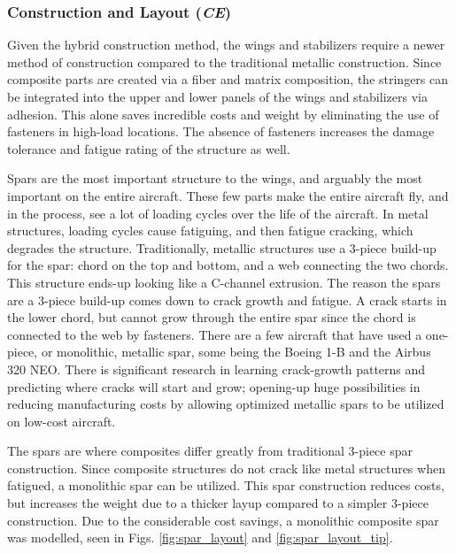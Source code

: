 \subsubsection{Construction and Layout (\textit{CE})}
Given the hybrid construction method, the wings and stabilizers require a newer method of construction compared to the traditional metallic construction. Since composite parts are created via a fiber and matrix composition, the stringers can be integrated into the upper and lower panels of the wings and stabilizers via adhesion. This alone saves incredible costs and weight by eliminating the use of fasteners in high-load locations. The absence of fasteners increases the damage tolerance and fatigue rating of the structure as well.

Spars are the most important structure to the wings, and arguably the most important on the entire aircraft. These few parts make the entire aircraft fly, and in the process, see a lot of loading cycles over the life of the aircraft. In metal structures, loading cycles cause fatiguing, and then fatigue cracking, which degrades the structure. Traditionally, metallic structures use a 3-piece build-up for the spar: chord on the top and bottom, and a web connecting the two chords. This structure ends-up looking like a C-channel extrusion. The reason the spars are a 3-piece build-up comes down to crack growth and fatigue. A crack starts in the lower chord, but cannot grow through the entire spar since the chord is connected to the web by fasteners. There are a few aircraft that have used a one-piece, or monolithic, metallic spar, some being the Boeing 1-B and the Airbus 320 NEO. There is significant research in learning crack-growth patterns and predicting where cracks will start and grow; opening-up huge possibilities in reducing manufacturing costs by allowing optimized metallic spars to be utilized on low-cost aircraft.

The spars are where composites differ greatly from traditional 3-piece spar construction. Since composite structures do not crack like metal structures when fatigued, a monolithic spar can be utilized. This spar construction reduces costs, but increases the weight due to a thicker layup compared to a simpler 3-piece construction. Due to the considerable cost savings, a monolithic composite spar was modelled, seen in Figs. \ref{fig:spar_layout} and \ref{fig:spar_layout_tip}.

